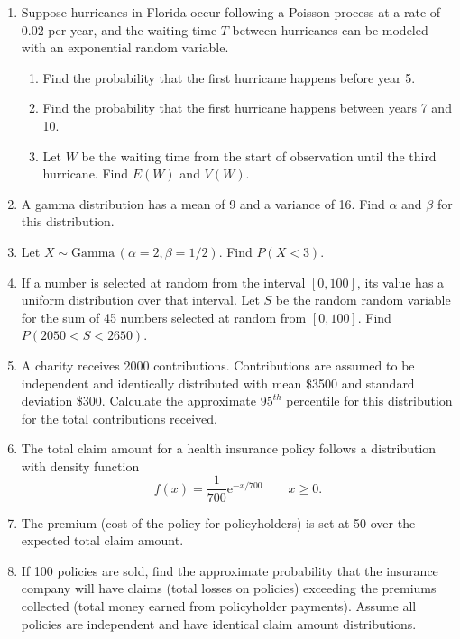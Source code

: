 \documentclass{article}
\newcommand{\follow}[1]{\sim \text{#1}\,}		%
\newcommand{\e}{\mathrm{e}}		%
\begin{document}
\begin{enumerate}
    \item Suppose hurricanes in Florida occur following a Poisson process at a rate of 0.02 per year, and the waiting time $T$ between hurricanes can be modeled with an exponential random variable.%
    \begin{enumerate}
        \item Find the probability that the first hurricane happens before year 5.%
        \item Find the probability that the first hurricane happens between years 7 and 10.%
        \item Let $W$ be the waiting time from the start of observation until the third hurricane. Find $E(W)$ and $V(W)$.%
    \end{enumerate}\bigskip
    
    \item A gamma distribution has a mean of 9 and a variance of 16. Find $\alpha$ and $\beta$ for this distribution.\bigskip%
    
    \item Let $X \follow{Gamma}(\alpha = 2, \beta = 1/2)$. Find $P(X < 3)$.\bigskip%
    
    \item If a number is selected at random from the interval $[0,100]$, its value has a uniform distribution over that interval. Let $S$ be the random random variable for the sum of 45 numbers selected at random from $[0,100]$. Find $P(2050 < S < 2650)$.\bigskip%
    
    \item A charity receives 2000 contributions. Contributions are assumed to be independent and identically distributed with mean \$3500 and standard deviation \$300. Calculate the approximate $95^{th}$ percentile for this distribution for the total contributions received.\bigskip%
    
    \item The total claim amount for a health insurance policy follows a distribution with density function%
    \[f(x) = \frac{1}{700} \e^{-x / 700} \quad\quad x \ge 0.\]
    \item[] The premium (cost of the policy for policyholders) is set at 50 over the expected total claim amount.
    \item[] If 100 policies are sold, find the approximate probability that the insurance company will have claims (total losses on policies) exceeding the premiums collected (total money earned from policyholder payments). Assume all policies are independent and have identical claim amount distributions.
\end{enumerate}
\end{document}
